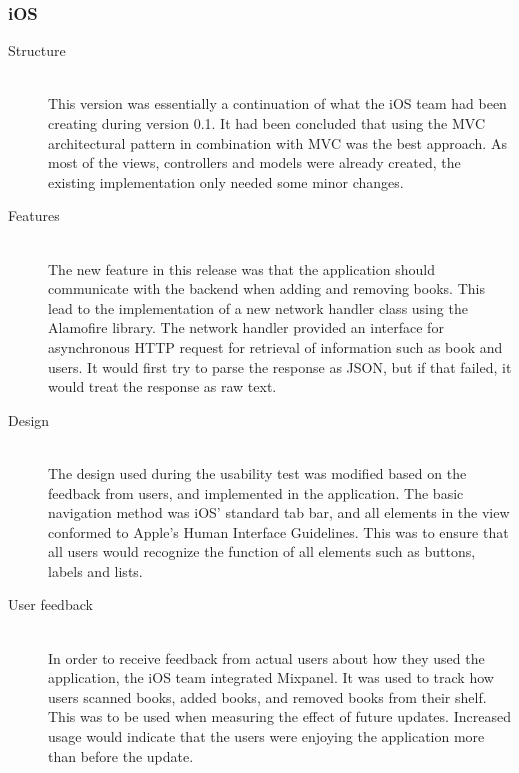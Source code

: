 \subsubsection{iOS}
\begin{description}
\item[Structure] \hfill\\
This version was essentially a continuation of what the iOS team had been creating during version 0.1. It had been concluded that using the \gls{MVC} architectural pattern in combination with \gls{MVC} was the best approach.\cite{architectural-pattern} As most of the views, controllers and models were already created, the existing implementation only needed some minor changes. 

\item[Features] \hfill\\
The new feature in this release was that the application should communicate with the \gls{backend} when adding and removing books. This lead to the implementation of a new network handler class using the Alamofire library.\cite{alamofire} The network handler provided an interface for asynchronous \gls{HTTP} request for retrieval of information such as book and users. It would first try to parse the response as \gls{JSON}, but if that failed, it would treat the response as raw text. 

\item[Design] \hfill\\
The design used during the usability test was modified based on the feedback from users, and implemented in the application. The basic navigation method was iOS' standard tab bar, and all elements in the view conformed to Apple's Human Interface Guidelines. \cite{human-interface-guidelines} This was to ensure that all users would recognize the function of all elements such as buttons, labels and lists.

\item[User feedback] \hfill\\
In order to receive feedback from actual users about how they used the application, the iOS team integrated Mixpanel.\cite{mixpanel} It was used to track how users scanned books, added books, and removed books from their shelf. This was to be used when measuring the effect of future updates. Increased usage would indicate that the users were enjoying the application more than before the update.
\end{description}

